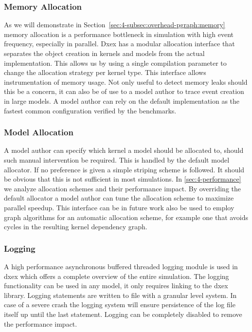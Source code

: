 \subsubsection{Memory Allocation}
As we will demonstrate in Section~\ref{sec:4-subsec:overhead-pgraph:memory} memory allocation is a performance bottleneck in simulation with high event frequency, especially in parallel. Dxex has a modular allocation interface that separates the object creation in kernels and models from the actual implementation. This allows us by using a single compilation parameter to change the allocation strategy per kernel type. This interface allows instrumentation of memory usage. Not only useful to detect memory leaks should this be a concern, it can also be of use to a model author to trace event creation in large models. A model author can rely on the default implementation as the fastest common configuration verified by the benchmarks.
\subsubsection{Model Allocation}
A model author can specify which kernel a model should be allocated to, should such manual intervention be required. This is handled by the default model allocator. If no preference is given a simple striping scheme is followed. It should be obvious that this is not sufficient in most simulations. In \ref{sec:4-performance} we analyze allocation schemes and their performance impact. By overriding the default allocator a model author can tune the allocation scheme to maximize parallel speedup. This interface can be in future work also be used to employ graph algorithms for an automatic allocation scheme, for example one that avoids cycles in the resulting kernel dependency graph.
\subsubsection{Logging}
A high performance asynchronous buffered threaded logging module is used in dxex which offers a complete overview of the entire simulation. The logging functionality can be used in any model, it only requires linking to the dxex library. Logging statements are written to file with a granular level system. In case of a severe crash the logging system will ensure persistence of the log file itself up until the last statement. Logging can be completely disabled to remove the performance impact.
